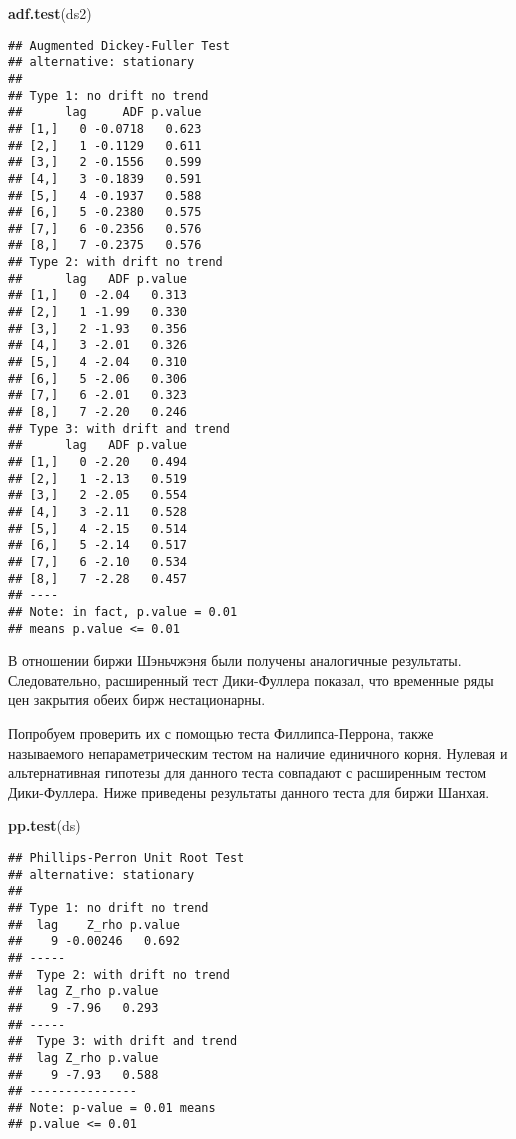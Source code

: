 \documentclass[a4paper,12pt]{article}
\newenvironment{Shaded}{\begin{snugshade}}{\end{snugshade}}
\newcommand{\KeywordTok}[1]{\textcolor[rgb]{0.13,0.29,0.53}{\textbf{#1}}}
\newcommand{\NormalTok}[1]{#1}
\begin{document}
\begin{Shaded}
\begin{Highlighting}[]
\KeywordTok{adf.test}\NormalTok{(ds2)}
\end{Highlighting}
\end{Shaded}
\begin{multicols}{2}
\begin{Verbatim}[fontsize=\small]
## Augmented Dickey-Fuller Test
## alternative: stationary
##
## Type 1: no drift no trend
##      lag     ADF p.value
## [1,]   0 -0.0718   0.623
## [2,]   1 -0.1129   0.611
## [3,]   2 -0.1556   0.599
## [4,]   3 -0.1839   0.591
## [5,]   4 -0.1937   0.588
## [6,]   5 -0.2380   0.575
## [7,]   6 -0.2356   0.576
## [8,]   7 -0.2375   0.576
## Type 2: with drift no trend
##      lag   ADF p.value
## [1,]   0 -2.04   0.313
## [2,]   1 -1.99   0.330
## [3,]   2 -1.93   0.356
## [4,]   3 -2.01   0.326
## [5,]   4 -2.04   0.310
## [6,]   5 -2.06   0.306
## [7,]   6 -2.01   0.323
## [8,]   7 -2.20   0.246
## Type 3: with drift and trend
##      lag   ADF p.value
## [1,]   0 -2.20   0.494
## [2,]   1 -2.13   0.519
## [3,]   2 -2.05   0.554
## [4,]   3 -2.11   0.528
## [5,]   4 -2.15   0.514
## [6,]   5 -2.14   0.517
## [7,]   6 -2.10   0.534
## [8,]   7 -2.28   0.457
## ----
## Note: in fact, p.value = 0.01
## means p.value <= 0.01
\end{Verbatim}
\end{multicols}

В отношении биржи Шэньчжэня были получены аналогичные результаты. Следовательно, расширенный тест Дики-Фуллера показал, что временные ряды цен закрытия обеих бирж нестационарны.

Попробуем проверить их с помощью теста Филлипса-Перрона, также называемого непараметрическим тестом на наличие единичного корня. Нулевая и альтернативная гипотезы для данного теста совпадают с расширенным тестом Дики-Фуллера. Ниже приведены результаты данного теста для биржи Шанхая.

\begin{Shaded}
\begin{Highlighting}[]
\KeywordTok{pp.test}\NormalTok{(ds)}
\end{Highlighting}
\end{Shaded}

\begin{multicols}{2}
\begin{Verbatim}[fontsize=\small]
## Phillips-Perron Unit Root Test
## alternative: stationary
##
## Type 1: no drift no trend
##  lag    Z_rho p.value
##    9 -0.00246   0.692
## -----
##  Type 2: with drift no trend
##  lag Z_rho p.value
##    9 -7.96   0.293
## -----
##  Type 3: with drift and trend
##  lag Z_rho p.value
##    9 -7.93   0.588
## ---------------
## Note: p-value = 0.01 means
## p.value <= 0.01
\end{Verbatim}
\end{multicols}
\end{document}
